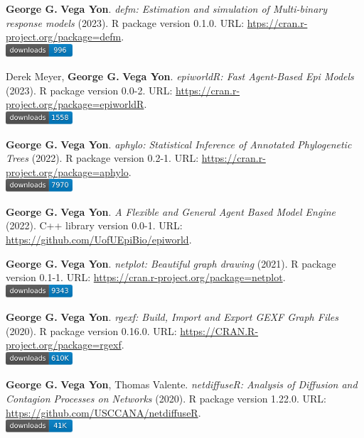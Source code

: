 \item \textbf{George G.} \textbf{Vega Yon}. \textit{defm: Estimation and simulation of Multi-binary response models} (2023). R package version 0.1.0. {\small URL}: \url{htps://cran.r-project.org/package=defm}. \\\includegraphics[width=2.5cm]{fig/cran-downloads-defm.pdf} 
\item Derek Meyer, \textbf{George G.} \textbf{Vega Yon}. \textit{epiworldR: Fast Agent-Based Epi Models} (2023). R package version 0.0-2. {\small URL}: \url{https://cran.r-project.org/package=epiworldR}. \\\includegraphics[width=2.5cm]{fig/cran-downloads-epiworldr.pdf} 
\item \textbf{George G.} \textbf{Vega Yon}. \textit{aphylo: Statistical Inference of Annotated Phylogenetic Trees} (2022). R package version 0.2-1. {\small URL}: \url{https://cran.r-project.org/package=aphylo}. \\\includegraphics[width=2.5cm]{fig/cran-downloads-aphylo.pdf} 
\item \textbf{George G.} \textbf{Vega Yon}. \textit{A Flexible and General Agent Based Model Engine} (2022). C++ library version 0.0-1. {\small URL}: \url{https://github.com/UofUEpiBio/epiworld}.  
\item \textbf{George G.} \textbf{Vega Yon}. \textit{netplot: Beautiful graph drawing} (2021). R package version 0.1-1. {\small URL}: \url{https://cran.r-project.org/package=netplot}. \\\includegraphics[width=2.5cm]{fig/cran-downloads-netplot.pdf} 
\item \textbf{George G.} \textbf{Vega Yon}. \textit{rgexf: Build, Import and Export GEXF Graph Files} (2020). R package version 0.16.0. {\small URL}: \url{https://CRAN.R-project.org/package=rgexf}. \\\includegraphics[width=2.5cm]{fig/cran-downloads-rgexf.pdf} 
\item \textbf{George G.} \textbf{Vega Yon}, Thomas Valente. \textit{{{netdiffuseR: Analysis of Diffusion and Contagion Processes on Networks}}} (2020). R package version 1.22.0. {\small URL}: \url{https://github.com/USCCANA/netdiffuseR}. \\\includegraphics[width=2.5cm]{fig/cran-downloads-netdiffuser.pdf} 
